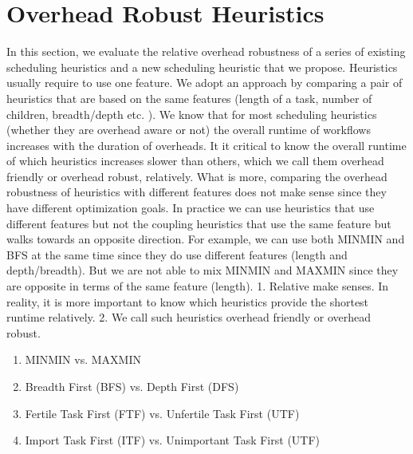 \documentclass[final]{IEEEtran}
\begin{document}
\section{Overhead Robust Heuristics}

In this section, we evaluate the relative overhead robustness of a series of existing scheduling heuristics and a new scheduling heuristic that we propose. Heuristics usually require to use one feature. We adopt an approach by comparing a pair of heuristics that are based on the same features (length of a task, number of children, breadth/depth etc. ). We know that for most scheduling heuristics (whether they are overhead aware or not) the overall runtime of workflows increases with the duration of overheads. It it critical to know the overall runtime of which heuristics increases slower than others, which we call them overhead friendly or overhead robust, relatively. What is more, comparing the overhead robustness of heuristics with different features does not make sense since they have different optimization goals. In practice we can use heuristics that use different features but not the coupling heuristics that use the same feature but walks towards an opposite direction. For example, we can use both MINMIN and BFS at the same time since they do use different features (length and depth/breadth). But we are not able to mix MINMIN and MAXMIN since they are opposite in terms of the same feature (length).
1. Relative make senses. In reality, it is more important to know which heuristics provide the shortest runtime relatively. 
2. 
We call such heuristics overhead friendly or overhead robust. 
\begin{enumerate}
\item MINMIN vs. MAXMIN
\item Breadth First (BFS) vs. Depth First (DFS)
\item Fertile Task First (FTF) vs. Unfertile Task First (UTF)
\item Import Task First (ITF) vs. Unimportant Task First (UTF)
\end{enumerate}
\end{document}
